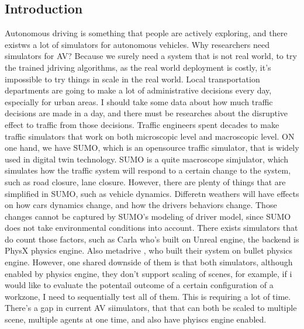 \subsection{Introduction}
Autonomous driving is something that people are actively exploring, and there existws a lot of simulators for autonomous vehicles. Why researchers need simulators for AV? Because we surely need a system that is not real world, to try the trained jdriving algorithms, as the real world deployment is costly, it's impossible to try things in scale in the real world. Local transportation departments are going to make a lot of administrative decisions every day, especially for urban areas. I should take some data about how much traffic decisions are made in a day, and there must be researches about the disruptive effect to traffic from those decisions. Traffic engineers spent decades to make traffic simulators that work on both microscopic level and macroscopic level. ON one hand, we have SUMO, which is an opensource traffic simulator, that is widely used in digital twin technology. SUMO is a quite macroscope simjulator, which simulates how the traffic system will respond to a certain change to the system, such as road closure, lane closure. However, there are plenty of things that are simplified in SUMO, such as vehicle dynamics. Differetn weathers will have effects on how cars dynamics change, and how the drivers behaviors change. Those changes cannot be captured by SUMO's modeling of driver model, since SUMO does not take environmental conditions into account. There exists simulators that do count those factors, such as Carla \cite{dosovitskiy_carla_2017}who's built on Unreal engine, the backend is PhysX physics engine. Also metadrive \cite{li_metadrive_2022}, who built their system on bullet physics engine. However, one shared downside of them is that both simulators, although enabled by physics engine, they don't support scaling of scenes, for example, if i would like to evaluate the potentail outcome of a certain configuration of a workzone, I need to sequentially test all of them. This is requiring a lot of time. There's a gap in current AV siimulators, that that can both be scaled to multiple scene, multiple agents at one time, and also have phyiscs engine enabled.

